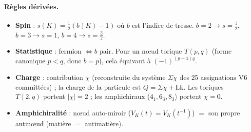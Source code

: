 \documentclass[11pt]{article}
\begin{document}
\paragraph{Règles dérivées.}
\begin{itemize}\itemsep2pt
\item \textbf{Spin} : $s(K)=\tfrac12(b(K)-1)$ où $b$ est l'indice de tresse. $b=2\to s=\tfrac12$, $b=3\to s=1$, $b=4\to s=\tfrac32$.
\item \textbf{Statistique} : fermion $\Longleftrightarrow b$ pair. Pour un nœud torique $T(p,q)$ (forme canonique $p<q$, donc $b=p$), cela équivaut à $(-1)^{(p-1)q}$.
\item \textbf{Charge} : contribution $\chi$ (reconstruite du système $\Sigma\chi$ des 25 assignations V6 committées) ; la charge de la particule est $Q=\Sigma\chi+\mathrm{Lk}$. Les toriques $T(2,q)$ portent $|\chi|=2$ ; les amphichiraux ($4_1,6_3,8_3$) portent $\chi=0$.
\item \textbf{Amphichiralité} : nœud auto-miroir ($V_K(t)=V_K(t^{-1})$) $=$ son propre antinœud (matière $=$ antimatière).
\end{itemize}
\end{document}
